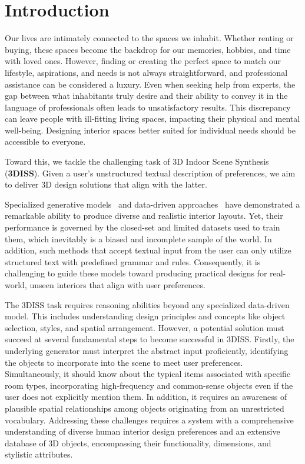 \documentclass[runningheads]{llncs}
\begin{document}
\section{Introduction}
\label{sec:intro}

Our lives are intimately connected to the spaces we inhabit. Whether renting or buying, these spaces become the backdrop for our memories, hobbies, and time with loved ones. However, finding or creating the perfect space to match our lifestyle, aspirations, and needs is not always straightforward, and professional assistance can be considered a luxury. Even when seeking help from experts, the gap between what inhabitants truly desire and their ability to convey it in the language of professionals often leads to unsatisfactory results. This discrepancy can leave people with ill-fitting living spaces, impacting their physical and mental well-being. Designing interior spaces better suited for individual needs should be accessible to everyone. 



Toward this, we tackle the challenging task of 3D Indoor Scene Synthesis (\textbf{3DISS}). Given a user's unstructured textual description of preferences, we aim to deliver 3D design solutions that align with the latter. 

Specialized generative models~\cite{hollein2023text2room, chung2023luciddreamer, Tang2023mvdiffusion} and data-driven approaches~\cite{wei2023lego, tang2023diffuscene, zhai2023commonscenes} have demonstrated a remarkable ability to produce diverse and realistic interior layouts. 
Yet, their performance is governed by the closed-set and limited datasets used to train them, which inevitably is a biased and incomplete sample of the world. In addition, such methods that accept textual input from the user can only utilize structured text with predefined grammar and rules.
Consequently, it is challenging to guide these models toward producing practical designs for real-world, unseen interiors that align with user preferences. 

The 3DISS task requires reasoning abilities beyond any specialized data-driven model. This includes understanding design principles and concepts like object selection, styles, and spatial arrangement. However, a potential solution must succeed at several fundamental steps to become successful in 3DISS. Firstly, the underlying generator must interpret the abstract input proficiently, \ie identifying the objects to incorporate into the scene to meet user preferences. Simultaneously, it should know about the typical items associated with specific room types, incorporating high-frequency and common-sense objects even if the user does not explicitly mention them. In addition, it requires an awareness of plausible spatial relationships among objects originating from an unrestricted vocabulary. Addressing these challenges requires a system with a comprehensive understanding of diverse human interior design preferences and an extensive database of 3D objects, encompassing their functionality, dimensions, and stylistic attributes. 
\end{document}
